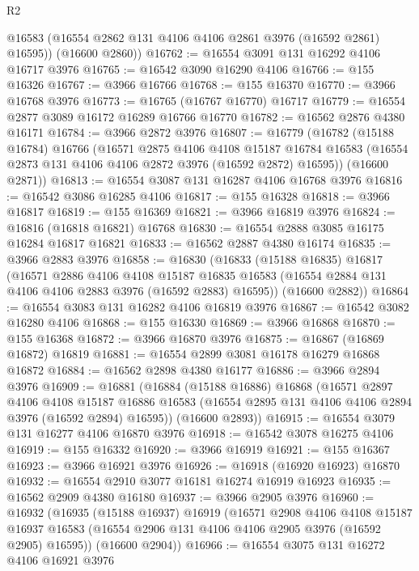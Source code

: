 \begin{lexlean}{R2}
\begin{coremodule}
        @16583
        (@16554 @2862 @131 @4106 @4106 @2861 @3976 (@16592 @2861) @16595))
      (@16600 @2860))
@16762 := @16554 @3091 @131 @16292 @4106 @16717 @3976
@16765 := @16542 @3090 @16290 @4106
@16766 := @155 @16326
@16767 := @3966 @16766
@16768 := @155 @16370
@16770 := @3966 @16768 @3976
@16773 := @16765 (@16767 @16770) @16717
@16779 := @16554 @2877 @3089 @16172 @16289 @16766 @16770
@16782 := @16562 @2876 @4380 @16171
@16784 := @3966 @2872 @3976
@16807 := @16779
    (@16782
      (@15188 @16784)
      @16766
      (@16571
        @2875
        @4106
        @4108
        @15187
        @16784
        @16583
        (@16554 @2873 @131 @4106 @4106 @2872 @3976 (@16592 @2872) @16595))
      (@16600 @2871))
@16813 := @16554 @3087 @131 @16287 @4106 @16768 @3976
@16816 := @16542 @3086 @16285 @4106
@16817 := @155 @16328
@16818 := @3966 @16817
@16819 := @155 @16369
@16821 := @3966 @16819 @3976
@16824 := @16816 (@16818 @16821) @16768
@16830 := @16554 @2888 @3085 @16175 @16284 @16817 @16821
@16833 := @16562 @2887 @4380 @16174
@16835 := @3966 @2883 @3976
@16858 := @16830
    (@16833
      (@15188 @16835)
      @16817
      (@16571
        @2886
        @4106
        @4108
        @15187
        @16835
        @16583
        (@16554 @2884 @131 @4106 @4106 @2883 @3976 (@16592 @2883) @16595))
      (@16600 @2882))
@16864 := @16554 @3083 @131 @16282 @4106 @16819 @3976
@16867 := @16542 @3082 @16280 @4106
@16868 := @155 @16330
@16869 := @3966 @16868
@16870 := @155 @16368
@16872 := @3966 @16870 @3976
@16875 := @16867 (@16869 @16872) @16819
@16881 := @16554 @2899 @3081 @16178 @16279 @16868 @16872
@16884 := @16562 @2898 @4380 @16177
@16886 := @3966 @2894 @3976
@16909 := @16881
    (@16884
      (@15188 @16886)
      @16868
      (@16571
        @2897
        @4106
        @4108
        @15187
        @16886
        @16583
        (@16554 @2895 @131 @4106 @4106 @2894 @3976 (@16592 @2894) @16595))
      (@16600 @2893))
@16915 := @16554 @3079 @131 @16277 @4106 @16870 @3976
@16918 := @16542 @3078 @16275 @4106
@16919 := @155 @16332
@16920 := @3966 @16919
@16921 := @155 @16367
@16923 := @3966 @16921 @3976
@16926 := @16918 (@16920 @16923) @16870
@16932 := @16554 @2910 @3077 @16181 @16274 @16919 @16923
@16935 := @16562 @2909 @4380 @16180
@16937 := @3966 @2905 @3976
@16960 := @16932
    (@16935
      (@15188 @16937)
      @16919
      (@16571
        @2908
        @4106
        @4108
        @15187
        @16937
        @16583
        (@16554 @2906 @131 @4106 @4106 @2905 @3976 (@16592 @2905) @16595))
      (@16600 @2904))
@16966 := @16554 @3075 @131 @16272 @4106 @16921 @3976

\end{coremodule}
\end{lexlean}
